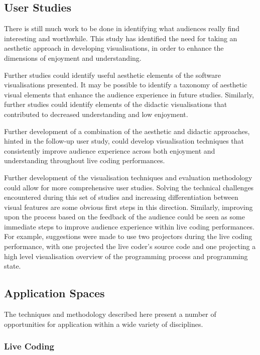 \subsection{User Studies}

There is still much work to be done in identifying what audiences really find interesting and worthwhile. This study has identified the need for taking an aesthetic approach in developing visualisations, in order to enhance the dimensions of enjoyment and understanding.

Further studies could identify useful aesthetic elements of the software visualisations presented. It may be possible to identify a taxonomy of aesthetic visual elements that enhance the audience experience in future studies. Similarly, further studies could identify elements of the didactic visualisations that contributed to decreased understanding and low enjoyment.

Further development of a combination of the aesthetic and didactic approaches, hinted in the follow-up user study, could develop visualisation techniques that consistently improve audience experience across both enjoyment and understanding throughout live coding performances.

Further development of the visualisation techniques and evaluation methodology could allow for more comprehensive user studies. Solving the technical challenges encountered during this set of studies and increasing differentiation between visual features are some obvious first steps in this direction. Similarly, improving upon the process based on the feedback of the audience could be seen as some immediate steps to improve audience experience within live coding performances. For example, suggestions were made to use two projectors during the live coding performance, with one projected the live coder's source code and one projecting a high level visualisation overview of the programming process and programming state.

\subsection{Application Spaces}

The techniques and methodology described here present a number of opportunities for application within a wide variety of disciplines.

\subsubsection{Live Coding}

